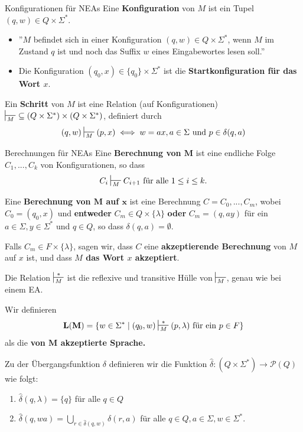 \documentclass[a4paper, 11pt]{article}
\begin{document}
    \begin{mainbox}{Konfigurationen für NEAs}
		Eine \textbf{Konfiguration} von $M$ ist ein Tupel $(q, w) \in Q \times \Sigma^*$. 
	\end{mainbox}
	\begin{itemize}[label=-]
		\item ''$M$ befindet sich in einer Konfiguration $(q,w) \in Q \times \Sigma^*$, wenn $M$ im Zustand $q$ ist und noch das Suffix $w$ eines Eingabewortes lesen soll.''
		\item Die Konfiguration $(q_0, x) \in \{q_0\} \times \Sigma^*$ ist die \textbf{Startkonfiguration für das Wort $x$}.
	\end{itemize}
	\begin{mainbox}{}
		Ein \textbf{Schritt} von $M$ ist eine Relation (auf Konfigurationen) $\sststile{M}{} \ \subseteq (Q \times \Sigma^*)\times(Q\times \Sigma^*)$, definiert durch
		$$(q, w) \sststile{M}{}(p, x) \iff w = ax, a \in \Sigma \text{ und }p \in \delta(q, a)$$
	\end{mainbox}

	\begin{mainbox}{Berechnungen für NEAs}
		Eine \textbf{Berechnung von $\mathbf{M}$} ist eine endliche Folge $C_1, ..., C_k$ von Konfigurationen, so dass 
		$$C_i \sststile{M}{} C_{i+1} \text{ für alle } 1 \leq i \leq k.$$

		Eine \textbf{Berechnung von $\mathbf{M}$ auf $\mathbf{x}$} ist eine Berechnung $C = C_0, ..., C_m$, wobei $C_0 = (q_0, x)$ und \textbf{entweder} $C_m \in Q \times \{\lambda\}$ \textbf{oder} $C_m = (q, ay)$ für ein $a \in \Sigma, y \in \Sigma^*$ und $q \in Q$, so dass $\delta(q, a) = \emptyset$.
	\end{mainbox}
	Falls $C_m \in F \times \{\lambda\}$, sagen wir, dass $C$ eine \textbf{akzeptierende Berechnung} von $M$ auf $x$ ist, und dass \textbf{$M$ das Wort $x$ akzeptiert}.

   
    Die Relation $\sststile{M}{*}$ ist die reflexive und transitive Hülle von $\sststile{M}{}$, genau wie bei einem EA.

    Wir definieren $$\mathbf{L(M)} = \{w \in \Sigma^* \mid (q_0, w) \sststile{M}{*} (p, \lambda) \text{ für ein } p \in F\}$$ als die \textbf{von $\mathbf{M}$ akzeptierte Sprache.}
    \begin{mainbox}{}
        Zu der Übergangsfunktion $\delta$ definieren wir die Funktion $\hat{\delta}: (Q \times \Sigma^*) \to \mathcal{P}(Q)$ wie folgt:
        \begin{enumerate}[label=(\roman*)]
            \item $\hat{\delta}(q, \lambda) = \{q\}$ für alle $q \in Q$
            \item $\hat{\delta}(q, wa) = \bigcup_{r \in \hat{\delta}(q,w)}\delta(r,a)$ für alle $q\in Q, a \in \Sigma, w \in \Sigma^*$.
        \end{enumerate}
    \end{mainbox}
\end{document}
